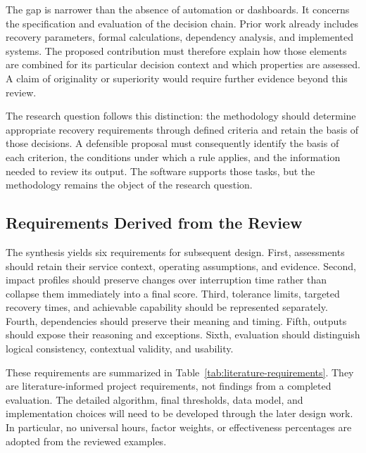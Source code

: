 The gap is narrower than the absence of automation or dashboards. It concerns the specification and evaluation of the decision chain. Prior work already includes recovery parameters, formal calculations, dependency analysis, and implemented systems. The proposed contribution must therefore explain how those elements are combined for its particular decision context and which properties are assessed. A claim of originality or superiority would require further evidence beyond this review.

The research question follows this distinction: the methodology should determine appropriate recovery requirements through defined criteria and retain the basis of those decisions. A defensible proposal must consequently identify the basis of each criterion, the conditions under which a rule applies, and the information needed to review its output. The software supports those tasks, but the methodology remains the object of the research question.

\subsection{Requirements Derived from the Review}

The synthesis yields six requirements for subsequent design. First, assessments should retain their service context, operating assumptions, and evidence. Second, impact profiles should preserve changes over interruption time rather than collapse them immediately into a final score. Third, tolerance limits, targeted recovery times, and achievable capability should be represented separately. Fourth, dependencies should preserve their meaning and timing. Fifth, outputs should expose their reasoning and exceptions. Sixth, evaluation should distinguish logical consistency, contextual validity, and usability.

These requirements are summarized in Table~\ref{tab:literature-requirements}. They are literature-informed project requirements, not findings from a completed evaluation. The detailed algorithm, final thresholds, data model, and implementation choices will need to be developed through the later design work. In particular, no universal hours, factor weights, or effectiveness percentages are adopted from the reviewed examples.

